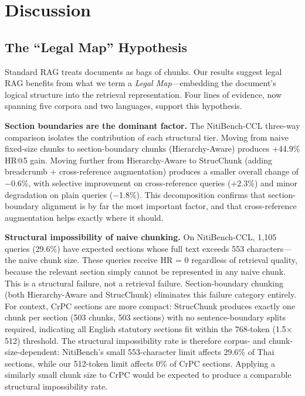 \documentclass[sn-mathphys,Numbered]{sn-jnl}%
\begin{document}
\section{Discussion}
\label{sec:discussion}

\subsection{The ``Legal Map'' Hypothesis}
\label{sec:disc_map}

Standard RAG treats documents as bags of chunks.  Our results suggest legal
RAG benefits from what we term a \emph{Legal Map}---embedding the
document's logical structure into the retrieval representation.  Four
lines of evidence, now spanning five corpora and two languages, support
this hypothesis.

\textbf{Section boundaries are the dominant factor.}  The NitiBench-CCL three-way comparison isolates the contribution of each structural tier.
Moving from naive fixed-size chunks to section-boundary chunks (Hierarchy-Aware)
produces +44.9\% HR@5 gain.  Moving further from Hierarchy-Aware to StrucChunk
(adding breadcrumb + cross-reference augmentation) produces a smaller
overall change of $-$0.6\%, with selective improvement on cross-reference
queries (+2.3\%) and minor degradation on plain queries ($-$1.8\%).  This
decomposition confirms that section-boundary alignment is by far the most
important factor, and that cross-reference augmentation helps exactly where
it should.

\textbf{Structural impossibility of naive chunking.}  On NitiBench-CCL,
1,105 queries (29.6\%) have expected sections whose full text exceeds 553
characters---the naive chunk size.  These queries receive HR = 0 regardless
of retrieval quality, because the relevant section simply cannot be
represented in any naive chunk.  This is a structural failure, not a
retrieval failure.  Section-boundary chunking (both Hierarchy-Aware and
StrucChunk) eliminates this failure category entirely.  For context, CrPC
sections are more compact: StrucChunk produces exactly one chunk per section
(503 chunks, 503 sections) with no sentence-boundary splits required,
indicating all English statutory sections fit within the 768-token
(1.5$\times$512) threshold.  The structural impossibility rate is therefore
corpus- and chunk-size-dependent: NitiBench's small 553-character limit
affects 29.6\% of Thai sections, while our 512-token limit affects 0\% of
CrPC sections.  Applying a similarly small chunk size to CrPC would be
expected to produce a comparable structural impossibility rate.
\end{document}
